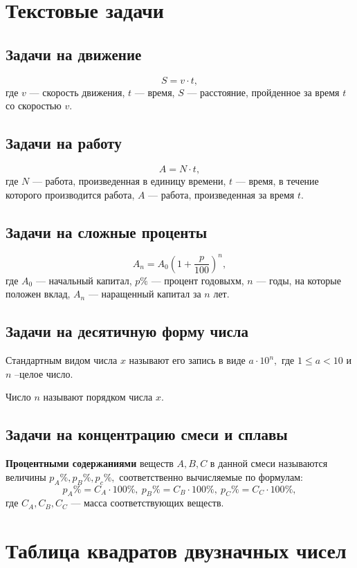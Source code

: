 \documentclass[a5paper, 8pt]{extarticle}
\begin{document}
\section{Текстовые задачи}
\subsection{Задачи на движение}
$$S=v\cdot t,$$
где $v$ --- скорость движения, $t$ --- время, $S$ --- расстояние, пройденное за время $t$ со скоростью $v.$
\subsection{Задачи на работу}
$$A=N\cdot t,$$
где $N$ --- работа, произведенная в единицу времени, $t$ --- время, в течение которого производится работа, $A$ --- работа, произведенная за время $t.$
\subsection{Задачи на сложные проценты}
$$A_n=A_0\left( 1+\frac{p}{100}\right)^n ,$$
где $A_0$ --- начальный капитал, $p\%$ --- процент годовыхм, $n$ --- годы, на которые положен вклад, $A_n$ --- наращенный капитал за $n$ лет. 
\subsection{Задачи на десятичную форму числа}
Стандартным видом числа $x$ называют его запись в виде $a\cdot 10^n,$ где $1\le a < 10$ и $n$ --целое число.

Число $n$ называют порядком числа $x.$ 

\subsection{Задачи на концентрацию смеси и сплавы}
\textbf{Процентными содержаниями} веществ $A, B, C$ в данной смеси называются величины $p_A\%, p_B\%, p_c\%,$ соответственно вычисляемые по формулам:
$$
p_A\%=C_A\cdot 100\%,\  p_B\%=C_B\cdot 100\%,\ p_C\%=C_C\cdot 100\%,
$$
где $C_A, C_B, C_C$ --- масса соответствующих веществ.

\section{Таблица квадратов двузначных чисел}
\end{document}
